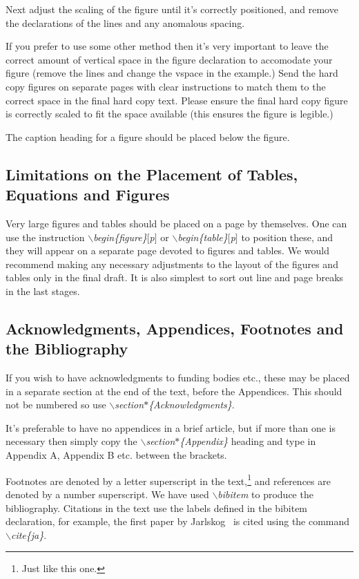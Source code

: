 \documentclass{ws-p8-50x6-00}
\begin{document}
Next adjust the scaling of the figure until it's correctly
positioned, and remove the declarations of the lines and any
anomalous spacing.

If you prefer to use some other method then it's very important
to leave the correct amount of vertical space in the figure
declaration to accomodate your figure (remove the lines and
change the vspace in the example.) Send the hard copy figures on
separate pages with clear instructions to match them to the
correct space in the final hard copy text. Please ensure the
final hard copy figure is correctly scaled to fit the space
available (this ensures the figure is legible.)

The caption heading for a figure should be placed below the
figure.

\subsection{Limitations on the Placement of Tables,
Equations and Figures}\label{sec:plac}
Very large figures and tables should be placed on a page by themselves. One
can use the instruction {\em $\backslash$begin\{figure\}$[$p$]$} or
{\em $\backslash$begin\{table\}$[$p$]$}
to position these, and they will appear on a separate page devoted to
figures and tables. We would recommend making any necessary
adjustments to the layout of the figures and tables
only in the final draft. It is also simplest to sort out line and
page breaks in the last stages.

\subsection{Acknowledgments, Appendices, Footnotes and the Bibliography}
If you wish to have acknowledgments to funding bodies etc.,
these may be placed in a separate section at the end of the
text, before the Appendices. This should not be numbered so use
{\em $\backslash$section$\ast$\{Acknowledgments\}}.

It's preferable to have no appendices in a brief article, but if more
than one is necessary then simply copy the
{\em $\backslash$section$\ast$\{Appendix\}}
heading and type in Appendix A, Appendix B etc. between the brackets.

Footnotes are denoted by a letter superscript
in the text,\footnote{Just like this one.} and references
are denoted by a number superscript.
We have used {\em $\backslash$bibitem} to produce the bibliography.
Citations in the text use the labels defined in the bibitem declaration,
for example, the first paper by Jarlskog~\cite{ja} is cited using the command
{\em $\backslash$cite\{ja\}}.
\end{document}
